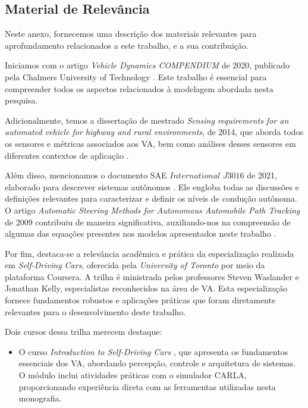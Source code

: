 \documentclass[
	12pt,				%
	oneside, %
	a4paper,			%
	english,			%
	french,				%
	spanish,			%
	brazil				%
	]{abntex2}
\begin{document}

\begin{anexosenv} 

\partanexos

\chapter{Material de Relevância}  \label{anexo}
Neste anexo, fornecemos uma descrição dos materiais relevantes para aprofundamento relacionados a este trabalho, e a sua contribuição.

Iniciamos com o artigo \textit{Vehicle Dynamics COMPENDIUM} de 2020, publicado pela Chalmers University of Technology \cite{jacobson2020vehicle}. Este trabalho é essencial para compreender todos os aspectos relacionados à modelagem abordada nesta pesquisa.

Adicionalmente, temos a dissertação de mestrado \textit{Sensing requirements for an automated vehicle for highway and rural environments}, de 2014, que aborda todos os sensores e métricas associados aos VA, bem como análises desses sensores em diferentes contextos de aplicação \cite{bussemaker2014sensing}.

Além disso, mencionamos o documento SAE $\textit{International J3016}$ de 2021, elaborado para descrever sistemas autônomos \cite{SAE}. Ele engloba todas as discussões e definições relevantes para caracterizar e definir os níveis de condução autônoma. O artigo \textit{Automatic Steering Methods for Autonomous
Automobile Path Tracking} de 2009 contribuiu de maneira significativa, auxiliando-nos na compreensão de algumas das equações presentes nos modelos apresentados neste trabalho \cite{snider2009automatic}.

Por fim, destaca-se a relevância acadêmica e prática da especialização realizada em \textit{Self-Driving Cars}, oferecida pela \textit{University of Toronto} por meio da plataforma Coursera. A trilha é ministrada pelos professores Steven Waslander e Jonathan Kelly, especialistas reconhecidos na área de VA. Esta especialização fornece fundamentos robustos e aplicações práticas que foram diretamente relevantes para o desenvolvimento deste trabalho.

Dois cursos dessa trilha merecem destaque:

\begin{itemize}
  \item O curso \textit{Introduction to Self-Driving Cars} \cite{University_of_Toronto2018-fe}, que apresenta os fundamentos essenciais dos VA, abordando percepção, controle e arquitetura de sistemas. O módulo inclui atividades práticas com o simulador CARLA, proporcionando experiência direta com as ferramentas utilizadas nesta monografia.


\end{itemize}
\end{anexosenv}
\end{document}

